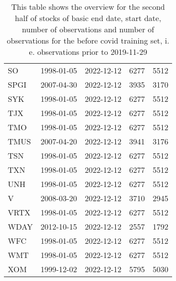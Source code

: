 \begin{table}[ht]
\begin{tabular}{lllrr}
  SO & 1998-01-05 & 2022-12-12 & 6277 & 5512 \\ 
  SPGI & 2007-04-30 & 2022-12-12 & 3935 & 3170 \\ 
  SYK & 1998-01-05 & 2022-12-12 & 6277 & 5512 \\ 
  TJX & 1998-01-05 & 2022-12-12 & 6277 & 5512 \\ 
  TMO & 1998-01-05 & 2022-12-12 & 6277 & 5512 \\ 
  TMUS & 2007-04-20 & 2022-12-12 & 3941 & 3176 \\ 
  TSN & 1998-01-05 & 2022-12-12 & 6277 & 5512 \\ 
  TXN & 1998-01-05 & 2022-12-12 & 6277 & 5512 \\ 
  UNH & 1998-01-05 & 2022-12-12 & 6277 & 5512 \\ 
  V & 2008-03-20 & 2022-12-12 & 3710 & 2945 \\ 
  VRTX & 1998-01-05 & 2022-12-12 & 6277 & 5512 \\ 
  WDAY & 2012-10-15 & 2022-12-12 & 2557 & 1792 \\ 
  WFC & 1998-01-05 & 2022-12-12 & 6277 & 5512 \\ 
  WMT & 1998-01-05 & 2022-12-12 & 6277 & 5512 \\ 
  XOM & 1999-12-02 & 2022-12-12 & 5795 & 5030 \\ 
   \hline
\end{tabular}
\caption[Overview_2]{This table shows the overview for the second half of stocks of basic end date, start date, number of observations and number of observations 
                     for the before covid training set, i. e. observations prior to 2019-11-29} 
\label{Table:Overview_2}
\end{table}
